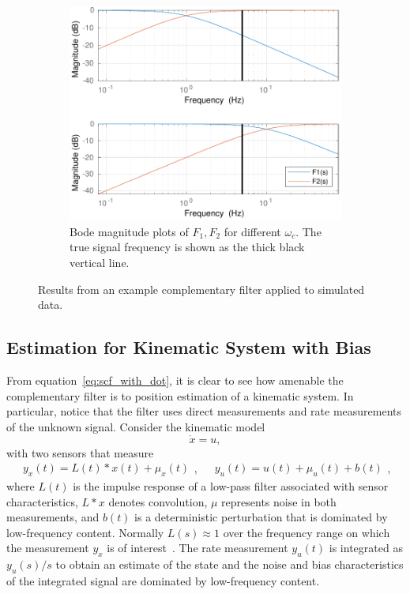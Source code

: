 \documentclass[a4paper]{article}
\begin{document}
\begin{figure}[h]
  \begin{subfigure}[t]{0.32\textwidth}
    \includegraphics[width=\textwidth]{scf_bode.pdf}
    \caption{Bode magnitude plots of $F_1, F_2$ for different $\omega_c$. The true signal frequency is shown as the thick black vertical line.}
    \label{fig:scf_bode}
  \end{subfigure}
  \caption{Results from an example complementary filter applied to simulated data.}
  \label{fig:scf}
\end{figure}

\subsection*{Estimation for Kinematic System with Bias}
From equation~\eqref{eq:scf_with_dot}, it is clear to see how amenable the complementary filter is to position estimation of a kinematic system.
In particular, notice that the filter uses direct measurements and rate measurements of the unknown signal.
Consider the kinematic model
\begin{equation}\label{eq:kinematic_model}
\dot{x} = u,
\end{equation}
with two sensors that measure
\begin{equation}
\begin{split}
y_x(t) = L(t)*x(t) + \mu_x(t)
\end{split},
\quad
\begin{split}
y_u(t) = u(t) + \mu_u(t) + b(t)
\end{split},
\end{equation}
where $L(t)$ is the impulse response of a low-pass filter associated with sensor characteristics, $L*x$ denotes convolution, $\mu$ represents noise in both measurements, and $b(t)$ is a deterministic perturbation that is dominated by low-frequency content.
Normally $L(s)\approx1$ over the frequency range on which the measurement $y_x$ is of interest~\cite{Mahony2008}.
The rate measurement $y_u(t)$ is integrated as $y_u(s)/s$ to obtain an estimate of the state and the noise and bias characteristics of the integrated signal are dominated by low-frequency content.
\end{document}
